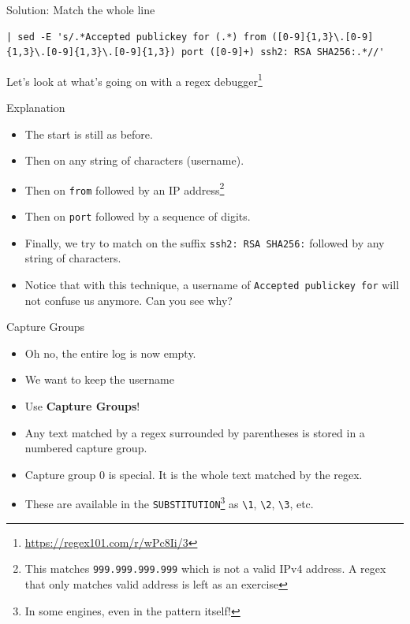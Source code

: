 \documentclass[12pt]{beamer}
\begin{document}
\begin{frame}[fragile]{Solution: Match the whole line}
  \begin{verbatim}
| sed -E 's/.*Accepted publickey for (.*) from ([0-9]{1,3}\.[0-9]{1,3}\.[0-9]{1,3}\.[0-9]{1,3}) port ([0-9]+) ssh2: RSA SHA256:.*//'
  \end{verbatim}
  Let's look at what's going on with a regex debugger\footnote{\url{https://regex101.com/r/wPc8Ii/3}}
\end{frame}

\begin{frame}{Explanation}
  \begin{itemize}
    \item The start is still as before.
    \item Then on any string of characters (username).
    \item Then on \texttt{from} followed by an IP address\footnote{This matches \texttt{999.999.999.999} which is not a valid IPv4 address. A regex that only matches valid address is left as an exercise}
    \item Then on \texttt{port} followed by a sequence of digits.
    \item Finally, we try to match on the suffix \texttt{ssh2: RSA SHA256:} followed by any string of characters.
    \item Notice that with this technique, a username of \texttt{Accepted publickey for} will not confuse us anymore. Can you see why?
  \end{itemize}
\end{frame}

\begin{frame}{Capture Groups}
  \begin{itemize}
    \item Oh no, the entire log is now empty.
    \item We want to keep the username
    \item Use \textbf{Capture Groups}!
    \item Any text matched by a regex surrounded by parentheses is stored in a numbered capture group.
    \item Capture group 0 is special. It is the whole text matched by the regex.
    \item These are available in the \texttt{SUBSTITUTION}\footnote{In some engines, even in the pattern itself!} as \texttt{\textbackslash 1}, \texttt{\textbackslash 2}, \texttt{\textbackslash 3}, etc.
  \end{itemize}
\end{frame}
\end{document}
